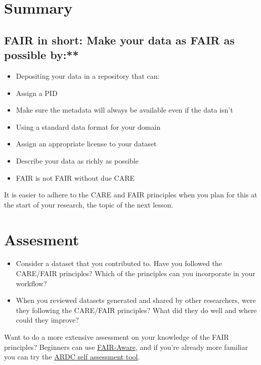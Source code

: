 \documentclass[
  letterpaper,
  DIV=11,
  numbers=noendperiod]{scrreport}
\providecommand{\tightlist}{%
  \setlength{\itemsep}{0pt}\setlength{\parskip}{0pt}}\usepackage{longtable,booktabs,array}
\begin{document}
\hypertarget{summary-12}{%
\section{Summary}\label{summary-12}}

\hypertarget{fair-in-short-make-your-data-as-fair-as-possible-by}{%
\subsection{FAIR in short: Make your data as FAIR as possible
by:**}\label{fair-in-short-make-your-data-as-fair-as-possible-by}}

\begin{itemize}
\tightlist
\item
  Depositing your data in a repository that can:
\item
  Assign a PID
\item
  Make sure the metadata will always be available even if the data isn't
\item
  Using a standard data format for your domain
\item
  Assign an appropriate license to your dataset
\item
  Describe your data as richly as possible
\item
  FAIR is not FAIR without due CARE
\end{itemize}

It is easier to adhere to the CARE and FAIR principles when you plan for
this at the start of your research, the topic of the next lesson.

\hypertarget{assesment}{%
\section{Assesment}\label{assesment}}

\begin{itemize}
\item
  Consider a dataset that you contributed to. Have you followed the
  CARE/FAIR principles? Which of the principles can you incorporate in
  your workflow?
\item
  When you reviewed datasets generated and shared by other researchers,
  were they following the CARE/FAIR principles? What did they do well
  and where could they improve?
\end{itemize}

Want to do a more extensive assessment on your knowledge of the FAIR
principles? Beginners can use
\href{https://fairaware.dans.knaw.nl/}{FAIR-Aware}, and if you're
already more familiar you can try the
\href{https://ardc.edu.au/resources/aboutdata/fair-data/fair-self-assessment-tool/}{ARDC
self assessment tool}.
\end{document}
